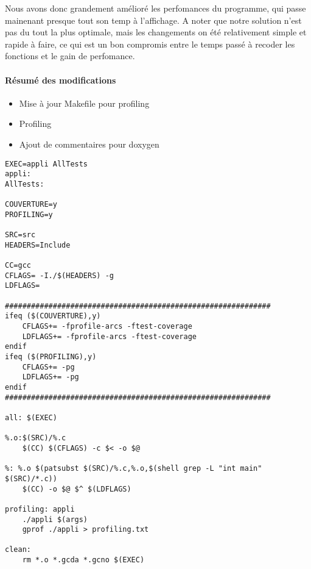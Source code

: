 \documentclass{article}
\begin{document}
Nous avons donc grandement amélioré les perfomances du programme, qui passe mainenant presque tout son temp à l'affichage. A noter que notre solution n'est pas du tout la plus optimale, mais les changements on été relativement simple et rapide à faire, ce qui est un bon compromis entre le temps passé à recoder les fonctions et le gain de perfomance.

\paragraph{Résumé des modifications}
\begin{itemize}
\item Mise à jour Makefile pour profiling
\item Profiling
\item Ajout de commentaires pour doxygen
\end{itemize}

\newpage

\appendix
  \begin{lstlisting}
EXEC=appli AllTests
appli:
AllTests:

COUVERTURE=y
PROFILING=y

SRC=src
HEADERS=Include

CC=gcc
CFLAGS= -I./$(HEADERS) -g
LDFLAGS=

#############################################################
ifeq ($(COUVERTURE),y)
	CFLAGS+= -fprofile-arcs -ftest-coverage 
	LDFLAGS+= -fprofile-arcs -ftest-coverage
endif
ifeq ($(PROFILING),y)
	CFLAGS+= -pg
	LDFLAGS+= -pg
endif
#############################################################

all: $(EXEC)

%.o:$(SRC)/%.c
	$(CC) $(CFLAGS) -c $< -o $@

%: %.o $(patsubst $(SRC)/%.c,%.o,$(shell grep -L "int main" $(SRC)/*.c))
	$(CC) -o $@ $^ $(LDFLAGS)

profiling: appli
	./appli $(args)
	gprof ./appli > profiling.txt

clean:
	rm *.o *.gcda *.gcno $(EXEC)


  \end{lstlisting}
\end{document}
